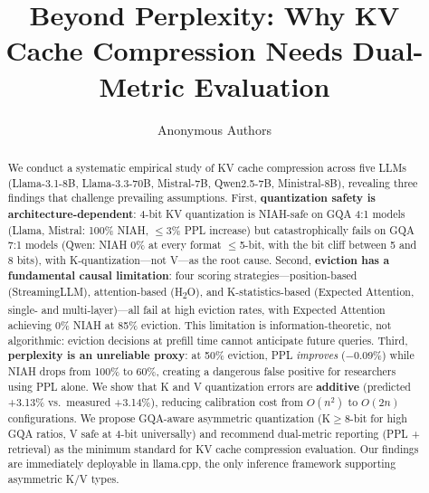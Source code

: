 \documentclass[11pt]{article}
\title{Beyond Perplexity: Why KV Cache Compression Needs Dual-Metric Evaluation}
\author{
  Anonymous Authors
}
\date{}
\begin{document}
\maketitle

\begin{abstract}
We conduct a systematic empirical study of KV cache compression across five LLMs (Llama-3.1-8B, Llama-3.3-70B, Mistral-7B, Qwen2.5-7B, Ministral-8B), revealing three findings that challenge prevailing assumptions.
First, \textbf{quantization safety is architecture-dependent}: 4-bit KV quantization is NIAH-safe on GQA 4:1 models (Llama, Mistral: 100\% NIAH, $\leq$3\% PPL increase) but catastrophically fails on GQA 7:1 models (Qwen: NIAH 0\% at every format $\leq$5-bit, with the bit cliff between 5 and 8 bits), with K-quantization---not V---as the root cause.
Second, \textbf{eviction has a fundamental causal limitation}: four scoring strategies---position-based (StreamingLLM), attention-based (H\textsubscript{2}O), and K-statistics-based (Expected Attention, single- and multi-layer)---all fail at high eviction rates, with Expected Attention achieving 0\% NIAH at 85\% eviction. This limitation is information-theoretic, not algorithmic: eviction decisions at prefill time cannot anticipate future queries.
Third, \textbf{perplexity is an unreliable proxy}: at 50\% eviction, PPL \emph{improves} ($-$0.09\%) while NIAH drops from 100\% to 60\%, creating a dangerous false positive for researchers using PPL alone.
We show that K and V quantization errors are \textbf{additive} (predicted +3.13\% vs.\ measured +3.14\%), reducing calibration cost from $O(n^2)$ to $O(2n)$ configurations.
We propose GQA-aware asymmetric quantization (K$\geq$8-bit for high GQA ratios, V safe at 4-bit universally) and recommend dual-metric reporting (PPL + retrieval) as the minimum standard for KV cache compression evaluation.
Our findings are immediately deployable in llama.cpp, the only inference framework supporting asymmetric K/V types.
\end{abstract}











\end{document}

